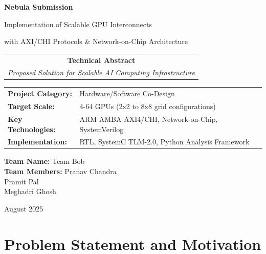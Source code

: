 \documentclass[11pt,a4paper]{article}
\begin{document}
\begin{titlepage}
    \centering
    \vspace*{2cm}
    
    {\Huge\textcolor{nebulablue}{\textbf{Nebula Submission}}}
    
    \vspace{0.5cm}
    {\Large\textcolor{nebulagray}{Implementation of Scalable GPU Interconnects}}
    
    \vspace{0.3cm}
    {\large\textcolor{nebulagray}{with AXI/CHI Protocols \& Network-on-Chip Architecture}}
    
    \vspace{2cm}
    
    \begin{tabular}{c}
        \textbf{\Large Technical Abstract} \\
        \textit{Proposed Solution for Scalable AI Computing Infrastructure}
    \end{tabular}
    
    \vspace{2cm}
    
    \begin{tabular}{ll}
        \textbf{Project Category:} & Hardware/Software Co-Design \\
        \textbf{Target Scale:} & 4-64 GPUs (2x2 to 8x8 grid configurations) \\
        \textbf{Key Technologies:} & ARM AMBA AXI4/CHI, Network-on-Chip, SystemVerilog \\
        \textbf{Implementation:} & RTL, SystemC TLM-2.0, Python Analysis Framework \\
    \end{tabular}
	\vspace{2cm}
	{\large \textbf{Team Name: } Team Bob} \\
	\vspace{1cm}
	{\large \textbf{Team Members: } Pranav Chandra \\ Pramit Pal \\ Meghadri Ghosh}

	
    
    \vfill
    
    {\large August 2025}
\end{titlepage}

\newpage

\section{Problem Statement and Motivation}
\end{document}
